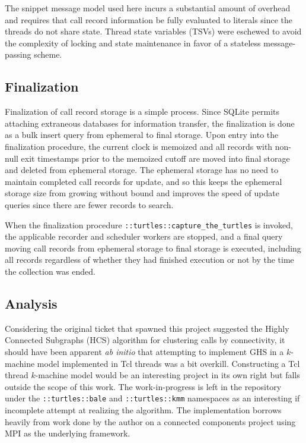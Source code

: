 \documentclass{article}[letter,10pt]
\begin{document}
{{{{        The snippet message model used here incurs a substantial amount of overhead and requires that call record information
        be fully evaluated to literals since the threads do not share state. Thread state variables (TSVs) were
        eschewed to avoid the complexity of locking and state maintenance in favor of a stateless message-passing scheme.
      }
    }
  }

  \subsection{Finalization}{
    Finalization of call record storage is a simple process. Since SQLite permits attaching extraneous databases
    for information transfer, the finalization is done as a bulk insert query from ephemeral to final storage.
    Upon entry into the finalization procedure, the current clock is memoized and all records with non-null exit
    timestamps prior to the memoized cutoff are moved into final storage and deleted from ephemeral storage.
    The ephemeral storage has no need to maintain completed call records for update, and so this keeps the ephemeral
    storage size from growing without bound and improves the speed of update queries since there are fewer records
    to search.

    When the finalization procedure \texttt{::turtles::capture\_the\_turtles} is invoked,
    the applicable recorder and scheduler workers are stopped, and a final query moving call records
    from ephemeral storage to final storage is executed, including all records regardless of whether they had
    finished execution or not by the time the collection was ended.
  }

  \subsection{Analysis}{
    Considering the original ticket that spawned this project suggested the Highly Connected Subgraphs (HCS) algorithm\autocite{HCS}
    for clustering calls by connectivity, it should have been apparent \emph{ab initio} that attempting to implement
    GHS in a $k$-machine model implemented in Tcl threads was a bit overkill. Constructing a Tcl thread $k$-machine
    model would be an interesting project in its own right but falls outside the scope of this work. The work-in-progress
    is left in the repository under the \texttt{::turtles::bale} and \texttt{::turtles::kmm} namespaces as an
    interesting if incomplete attempt at realizing the algorithm. The implementation borrows heavily from work
    done by the author\autocite{ghscoco} on a connected components project using MPI\autocites{mpi}{openmpi} as the underlying framework.

}}
\end{document}
